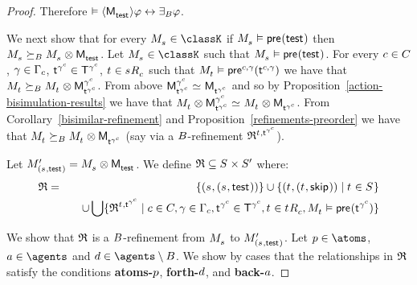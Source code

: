 \begin{proof}
Therefore $\entails \actionE{\aPModel{\aStateTest}} \phi \iff \someactsBs \phi$.

We next show that for every $\kPModel{\kStateS} \in \classK$ if $\kPModel{\kStateS} \entails \aPrecondition(\aStateTest)$ then $\kPModel{\kStateS} \simulatesBs \kPModel{\kStateS} \exec \aPModel{\aStateTest}$.
Let $\kPModel{\kStateS} \in \classK$ such that $\kPModel{\kStateS} \entails \aPrecondition(\aStateTest)$.
For every $\agentC \in \agentsC$, $\gamma \in \Gamma_\agentC$, $\aStateT[\gamma^\agentC] \in \aStatesT[\gamma^\agentC]$, $\kStateT \in \kSuccessorsC{\kStateS}$ such that $\kPModel{\kStateT} \entails \aPrecondition[\agentC,\gamma](\aStateT[\agentC,\gamma])$ we have that $\kPModel{\kStateT} \simulatesBs \kPModel{\kStateT} \exec \aPModel[\gamma^\agentC]{\aStateT[\gamma^\agentC]}$.
From above $\aPModel[\gamma^\agentC]{\aStateT[\gamma^\agentC]} \bisimilar \aPModel{\aStateT[\gamma^\agentC]}$ and so by Proposition~\ref{action-bisimulation-results} we have that $\kPModel{\kStateT} \exec \aPModel[\gamma^\agentC]{\aStateT[\gamma^\agentC]} \bisimilar \kPModel{\kStateT} \exec \aPModel{\aStateT[\gamma^\agentC]}$.
From Corollary~\ref{bisimilar-refinement} and Proposition~\ref{refinements-preorder} we have that $\kPModel{\kStateT} \simulatesBs \kPModel{\kStateT} \exec \aPModel{\aStateT[\gamma^\agentC]}$ (say via a $\agentsB$-refinement $\refinement^{\kStateT, \aStateT[\gamma^\agentC]}$).

Let $\kPModelP{(\kStateS, \aStateTest)} = \kPModel{\kStateS} \exec \aPModel{\aStateTest}$.
We define $\refinement \subseteq \kStates \times \kStatesP$ where:
\begin{eqnarray*}
\refinement &=& 
\{(\kStateS, (\kStateS, \aStateTest))\} \cup 
\{(\kStateT, (\kStateT, \aStateSkip)) \mid \kStateT \in \kStates\}  \\&&\quad \cup
\bigcup \{\refinement^{\kStateT, \aStateT[\gamma^\agentC]} \mid \agentC \in \agentsC, \gamma \in \Gamma_\agentC, \aStateT[\gamma^\agentC] \in \aStatesT[\gamma^\agentC], \kStateT \in \kSuccessorsC{\kStateT}, \kPModel{\kStateT} \entails \aPrecondition(\aStateT[\gamma^\agentC])\}
\end{eqnarray*}

We show that $\refinement$ is a $\agentsB$-refinement from $\kPModel{\kStateS}$ to $\kPModelP{(\kStateS, \aStateTest)}$.
Let $\atomP \in \atoms$, $\agentA \in \agents$ and $\agentD \in \agents \setminus \agentsB$.
We show by cases that the relationships in $\refinement$ satisfy the conditions {\bf atoms-$\atomP$}, {\bf forth-$\agentD$}, and {\bf back-$\agentA$}.


\end{proof}
